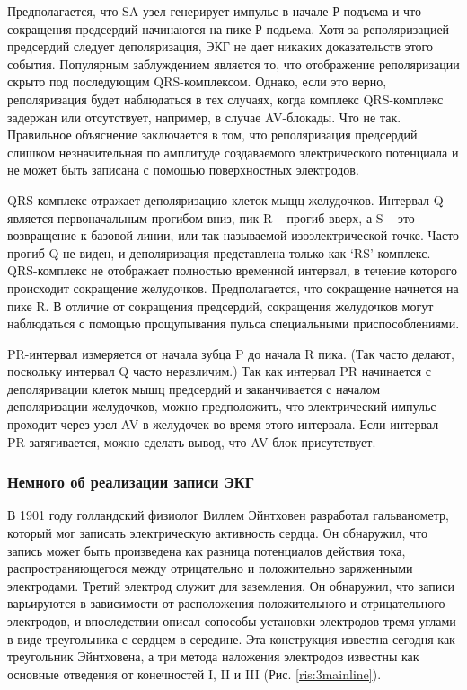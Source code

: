Предполагается, что SA-узел генерирует импульс в начале Р-подъема и что сокращения предсердий начинаются на пике Р-подъема. Хотя за реполяризацией предсердий следует деполяризация, ЭКГ не дает никаких доказательств этого события. Популярным заблуждением является то, что отображение реполяризации скрыто под последующим QRS-комплексом. Однако, если это верно, реполяризация будет наблюдаться в тех случаях, когда комплекс QRS-комплекс задержан или отсутствует, например, в случае AV-блокады. Что не так. Правильное объяснение заключается в том, что реполяризация предсердий  слишком незначительная по амплитуде создаваемого электрического потенциала и не может быть записана с помощью поверхностных электродов.

QRS-комплекс отражает деполяризацию клеток мыщц желудочков. Интервал Q является первоначальным прогибом вниз, пик R -- прогиб вверх, а S -- это возвращение к базовой линии, или так называемой изоэлектрической точке. Часто прогиб Q не виден, и деполяризация представлена только как ‘RS’ комплекс. QRS-комплекс не
отображает полностью временной интервал, в течение которого происходит сокращение желудочков. Предполагается, что сокращение начнется на пике R. В отличие от сокращения предсердий, сокращения желудочков могут наблюдаться с помощью прощупывания пульса специальными приспособлениями.

PR-интервал измеряется от начала зубца P до начала R пика. (Так часто делают, поскольку интервал Q часто неразличим.) Так как интервал PR начинается с деполяризации клеток мышц предсердий и заканчивается с началом деполяризации желудочков, можно предположить, что электрический импульс проходит через узел AV в желудочек во время этого интервала. Если интервал PR затягивается, можно сделать вывод, что AV блок присутствует.

\subsubsection{Немного об реализации записи ЭКГ}

В 1901 году голландский физиолог Виллем Эйнтховен разработал гальванометр, который мог записать электрическую активность сердца. Он обнаружил, что запись может быть произведена как разница потенциалов действия тока, распространяющегося между отрицательно и положительно заряженными электродами. Третий электрод служит для заземления. Он обнаружил, что записи варьируются в зависимости от расположения положительного и отрицательного электродов, и впоследствии описал сопособы установки электродов тремя углами в виде треугольника с сердцем в середине. Эта конструкция известна сегодня как треугольник Эйнтховена, а три метода наложения электродов известны как основные отведения от конечностей I, II и III (Рис. \ref{ris:3mainline}).

